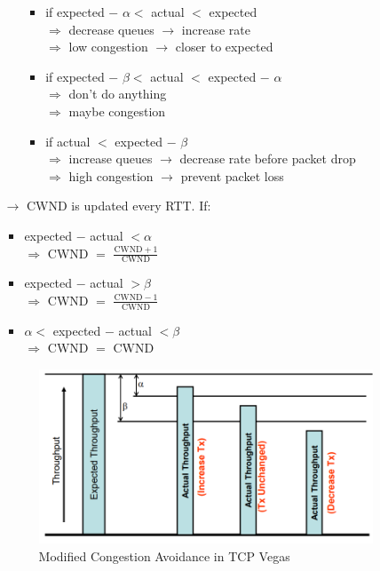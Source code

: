 \begin{itemize}
\begin{itemize}
\begin{itemize}
\begin{itemize}
                \item if expected $-$ $\alpha <$ actual $<$ expected\\
                $\Rightarrow$ decrease queues $\rightarrow$ increase rate\\
                $\Rightarrow$ low congestion $\rightarrow$ closer to expected
                \item if expected $-$ $\beta <$ actual $<$ expected $-$ $\alpha$\\
                $\Rightarrow$ don't do anything\\
                $\Rightarrow$ maybe congestion
                \item if actual $<$ expected $-$ $\beta$\\
                $\Rightarrow$ increase queues $\rightarrow$ decrease rate before packet drop\\
                $\Rightarrow$ high congestion $\rightarrow$ prevent packet loss
            \end{itemize}
        \end{itemize}
        \item[$\rightarrow$] CWND is updated every RTT. If:
        \begin{itemize}
            \item expected $-$ actual $< \alpha$\\
            $\Rightarrow$ CWND $=$ $\frac{\text{CWND} + 1}{\text{CWND}}$
            \item expected $-$ actual $> \beta$\\
            $\Rightarrow$ CWND $=$ $\frac{\text{CWND} - 1}{\text{CWND}}$
            \item $\alpha <$ expected $-$ actual $< \beta$\\
            $\Rightarrow$ CWND $=$ CWND
        \end{itemize}
        \begin{figure}[!h] 
            \centering 
            \includegraphics[scale = 0.4]{images/congestion-avoidance-vegas.png} 
            \caption{Modified Congestion Avoidance in TCP Vegas}
            \label{congestion-avoidance-vegas}
        \end{figure}
    \end{itemize}
\end{itemize}

